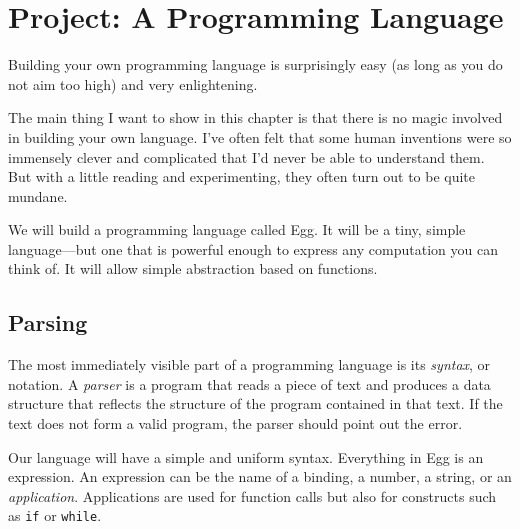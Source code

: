 \chapter{Project: A Programming Language}\label{language}


Building your own programming language is surprisingly easy (as long as you do not aim too high) and very enlightening.

The main thing I want to show in this chapter is that there is no magic involved in building your own language. I've often felt that some human inventions were so immensely clever and complicated that I'd never be able to understand them. But with a little reading and experimenting, they often turn out to be quite mundane.

We will build a programming language called Egg. It will be a tiny, simple language—but one that is powerful enough to express any computation you can think of. It will allow simple abstraction based on functions.

\label{language.parsing}\section{Parsing}

The most immediately visible part of a programming language is its \emph{syntax}, or notation. A \emph{parser} is a program that reads a piece of text and produces a data structure that reflects the structure of the program contained in that text. If the text does not form a valid program, the parser should point out the error.

Our language will have a simple and uniform syntax. Everything in Egg is an expression. An expression can be the name of a binding, a number, a string, or an \emph{application}. Applications are used for function calls but also for constructs such as \lstinline`if` or \lstinline`while`.

